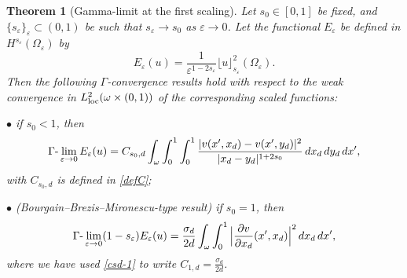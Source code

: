 \documentclass[11pt]{article}
\newtheorem{theorem}[definition]{Theorem}
\def\e{\varepsilon}
\begin{document}
\begin{theorem}[Gamma-limit at the first scaling]\label{fulldim} 
Let $s_0\in[0,1]$ be fixed, and $\{s_\e\}_\e\subset (0,1)$ be such that $s_\e\to s_0$ as $\e\to 0$. 
Let the functional $E_\e$ be defined in $H^{s_\e}(\Omega_\e)$ by 
$$E_\e(u)=\frac{1}{\e^{1-2s_\e}}\lfloor u\rfloor_{s_\e}^2(\Omega_\e).$$ 
Then the following 
$\Gamma$-convergence results hold with respect to the weak convergence in $L^2_{
\rm loc}(\omega\times (0,1))$ of the corresponding scaled functions:

\indent $\bullet$ if $s_0<1$, then 
$$\Gamma\hbox{\rm -}\lim_{\e\to 0}{E_\e}({u})=C_{s_0,d}\int_{\omega}\int_0^1\int_0^1\frac{|v(x^\prime, x_d)-v(x^\prime, y_d)|^2}{|x_d-y_d|^{1+2s_0}}\, dx_d\, dy_d\, dx^\prime,$$
\hspace{8mm} with $C_{s_0,d}$ is defined in  \eqref{defC}; 

\smallskip 

\indent $\bullet$ {\rm(Bourgain--Brezis--Mironescu-type result)} if $s_0=1$, then 
\begin{equation*}\Gamma\hbox{\rm -}\lim_{\e\to 0}(1-s_\e){E_\e}(u)
= \frac{\sigma_d}{2d} \int_{\omega}\int_0^1 \Big|\frac{\partial v}{\partial x_d}(x^\prime,x_d)\Big|^2\,dx_d\, dx^\prime, 
\end{equation*}
\smallskip 
where we have used \eqref{csd-1} to write $C_{1,d}=\frac{\sigma_d}{2d}$.
\end{theorem} 
\end{document}
